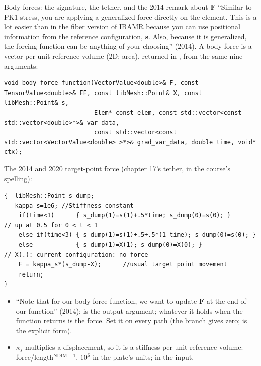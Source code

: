 \documentclass[aspectratio=169,11pt]{beamer}
\begin{document}
\begin{frame}[fragile]{Body forces: the signature, the tether, and the 2014 remark about $\mathbf{F}$}
\label{fr:bodyforce}
\scriptsize
``Similar to PK1 stress, you are applying a generalized force directly on the element. This is a lot easier than in the fiber version of IBAMR because you can use positional information from the reference configuration, $\mathbf{s}$. Also, because it is generalized, the forcing function can be anything of your choosing'' (2014). A body force is a vector per unit reference volume (2D: area), returned in , from the same nine arguments:
\begin{lstlisting}[style=cpptiny]
void body_force_function(VectorValue<double>& F, const TensorValue<double>& FF, const libMesh::Point& X, const libMesh::Point& s,
                         Elem* const elem, const std::vector<const std::vector<double>*>& var_data,
                         const std::vector<const std::vector<VectorValue<double> >*>& grad_var_data, double time, void* ctx);
\end{lstlisting}
The 2014 and 2020 target-point force (chapter 17's tether, in the course's spelling):
\begin{lstlisting}[style=cpptiny]
{  libMesh::Point s_dump;
   kappa_s=1e6; //Stiffness constant
    if(time<1)      { s_dump(1)=s(1)+.5*time; s_dump(0)=s(0); }      // up at 0.5 for 0 < t < 1
    else if(time<3) { s_dump(1)=s(1)+.5+.5*(1-time); s_dump(0)=s(0); }
    else            { s_dump(1)=X(1); s_dump(0)=X(0); }              // X(.): current configuration: no force
    F = kappa_s*(s_dump-X);      //usual target point movement
    return;
}
\end{lstlisting}
\begin{itemize}
  \item ``Note that for our body force function, we want to update $\mathbf{F}$ at the end of our function'' (2014):  is the output argument; whatever it holds when the function returns is the force. Set it on every path (the  branch gives zero;  is the explicit form).
  \item $\kappa_s$ multiplies a displacement, so it is a stiffness per unit reference volume: force/length$^{\mathrm{NDIM}+1}$. $10^6$ in the plate's units;  in the input.
\end{itemize}
\end{frame}
\end{document}
